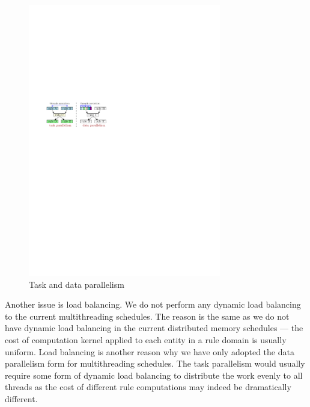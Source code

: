 \documentclass{article}
\begin{document}
\begin{figure}[h]
  \begin{center}
    \includegraphics[width=0.75\textwidth]{loci-overview}
    \caption{Task and data parallelism\label{fig:loci-overview}}
  \end{center}
\end{figure}

Another issue is load balancing.  We do not perform any dynamic load
balancing to the current multithreading schedules.  The reason is the
same as we do not have dynamic load balancing in the current distributed
memory schedules --- the cost of computation kernel applied to each
entity in a rule domain is usually uniform.  Load balancing is another
reason why we have only adopted the data parallelism form for
multithreading schedules.  The task parallelism would usually require
some form of dynamic load balancing to distribute the work evenly to all
threads as the cost of different rule computations may indeed be
dramatically different.
\end{document}

